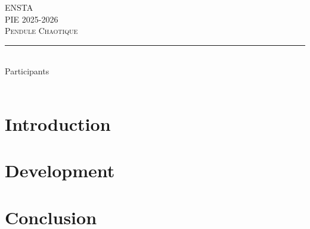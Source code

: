 \documentclass[12pt]{article}
\begin{document}
\begin{titlepage}
\newcommand{\HRule}{\rule{\linewidth}{0.5mm}}
\center
\textsc{\Large ENSTA}\\[0.2cm] 
\textsc{\large PIE 2025-2026}\\[1.0cm] 

\textsc{\Large Pendule Chaotique}\\[0.2cm]
\HRule \\[1.0cm]

\flushleft \Large
Participants\\


\center {\today}\\[2cm]

\newpage

\tableofcontents
\end{titlepage}



\section{Introduction}

\section{Development}

\section{Conclusion}





\end{document}

